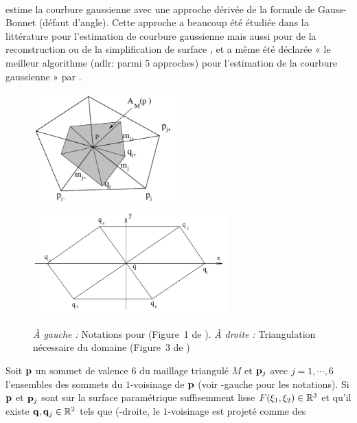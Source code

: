 \paragraph{}
%
 estime la courbure gaussienne avec une approche dérivée de
la formule de Gauss-Bonnet (défaut d'angle). Cette approche a beaucoup été
étudiée dans la littérature pour l'estimation de courbure gaussienne
\cite{Meek2000, Stokely1992} mais aussi pour de la reconstruction \cite{Dyn2001}
ou de la simplification de surface \cite{Kim2002}, et a même été déclarée « le
meilleur algorithme (ndlr: parmi 5 approches) pour l'estimation de la courbure
gaussienne » par .
%
\begin{figure}[ht]
    \begin{center}
      \includegraphics[width=5.5cm]{images/Curvature/Notations_Xu}
      \includegraphics[width=7.5cm]{images/Curvature/Notations_Xu_2}
    \end{center}
    \caption[Notations pour .]{\emph{À gauche :} Notations pour  (Figure~1 de \cite{Xu2006}). \emph{À droite :} Triangulation nécessaire du domaine (Figure~3 de \cite{Xu2006})}
    \label{fig:xu_notations}
\end{figure}
%
Soit $\mathbf{p}$ un sommet de valence $6$ du maillage triangulé $M$ et $\mathbf{p}_j$ avec
$j = 1,\cdots, 6$ l'ensembles des sommets du $1$-voisinage de $\mathbf{p}$ (voir
-gauche pour les notations). Si $\mathbf{p}$ et $\mathbf{p}_j$
sont sur la surface paramétrique suffisemment lisse $F(\xi_1,\xi_2) \in \mathbb{R}^3$ et
qu'il existe $\mathbf{q}, \mathbf{q}_j \in \mathbb{R}^2$ tels que
(-droite, le $1$-voisinage est projeté comme des

